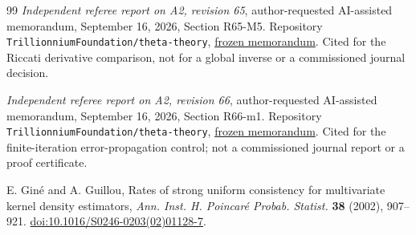 \begin{thebibliography}{99}
\emph{Independent referee report on A2, revision 65},
author-requested AI-assisted memorandum, September 16, 2026,
Section R65-M5. Repository
\texttt{Trillionnium\allowbreak Foundation/\allowbreak theta-theory},
\href{https://github.com/TrillionniumFoundation/theta-theory/blob/7f4603531f7b97a23ce627fec47b7ddc5f4f9912/reviews/a2-v65-independent-harsh-top4-2026-09-16/REFEREE_REPORT.md}{frozen memorandum}.
Cited for the Riccati derivative comparison, not for a global inverse
or a commissioned journal decision.


\emph{Independent referee report on A2, revision 66},
author-requested AI-assisted memorandum, September 16, 2026,
Section R66-m1. Repository
\texttt{Trillionnium\allowbreak Foundation/\allowbreak theta-theory},
\href{https://github.com/TrillionniumFoundation/theta-theory/blob/3d49684cc6c9bad36d80c99dc46af276f53fae18/reviews/a2-v66-independent-harsh-top4-2026-09-16/REFEREE_REPORT.md}{frozen memorandum}.
Cited for the finite-iteration error-propagation control; not a
commissioned journal report or a proof certificate.


E. Gin\'e and A. Guillou,
Rates of strong uniform consistency for multivariate kernel density
estimators, \emph{Ann. Inst. H. Poincar\'e Probab. Statist.}
\textbf{38} (2002), 907--921.
\href{https://doi.org/10.1016/S0246-0203(02)01128-7}{doi:10.1016/S0246-0203(02)01128-7}.

\end{thebibliography}
